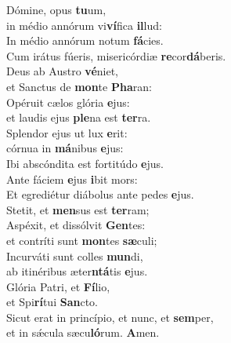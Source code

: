 \evenverse Dómine, opus \textbf{tu}um,~\*\\
\evenverse in médio annórum vi\textbf{ví}fica \textbf{il}lud:\\
\oddverse In médio annórum notum \textbf{fá}cies.~\*\\
\oddverse Cum irátus fúeris, misericórdiæ \textbf{re}cor\textbf{dá}beris.\\
\evenverse Deus ab Austro \textbf{vé}niet,~\*\\
\evenverse et Sanctus de \textbf{mon}te \textbf{Pha}ran:\\
\oddverse Opéruit cælos glória \textbf{e}jus:~\*\\
\oddverse et laudis ejus \textbf{ple}na est \textbf{ter}ra.\\
\evenverse Splendor ejus ut lux \textbf{e}rit:~\*\\
\evenverse córnua in \textbf{má}nibus \textbf{e}jus:\\
\oddverse Ibi abscóndita est fortitúdo \textbf{e}jus.~\*\\
\oddverse Ante fáciem \textbf{e}jus \textbf{i}bit mors:\\
\evenverse Et egrediétur diábolus ante pedes \textbf{e}jus.~\*\\
\evenverse Stetit, et \textbf{men}sus est \textbf{ter}ram;\\
\oddverse Aspéxit, et dissólvit \textbf{Gen}tes:~\*\\
\oddverse et contríti sunt \textbf{mon}tes \textbf{sæ}culi;\\
\evenverse Incurváti sunt colles \textbf{mun}di,~\*\\
\evenverse ab itinéribus æter\textbf{ntá}tis \textbf{e}jus.\\
\oddverse Glória Patri, et \textbf{Fí}lio,~\*\\
\oddverse et Spi\textbf{rí}tui \textbf{San}cto.\\
\evenverse Sicut erat in princípio, et nunc, et \textbf{sem}per,~\*\\
\evenverse et in sǽcula sæcu\textbf{ló}rum. \textbf{A}men.\\
